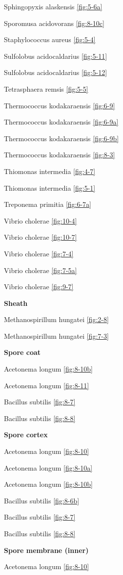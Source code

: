 \documentclass[]{tufte-book}
\begin{document}
Sphingopyxis alaskensis \ref{fig:5-6a}

Sporomusa acidovorans \ref{fig:8-10c}

Staphylococcus aureus \ref{fig:5-4}

Sulfolobus acidocaldarius \ref{fig:5-11}

Sulfolobus acidocaldarius \ref{fig:5-12}

Tetrasphaera remsis \ref{fig:5-5}

Thermococcus kodakaraensis \ref{fig:6-9}

Thermococcus kodakaraensis \ref{fig:6-9a}

Thermococcus kodakaraensis \ref{fig:6-9b}

Thermococcus kodakaraensis \ref{fig:8-3}

Thiomonas intermedia \ref{fig:4-7}

Thiomonas intermedia \ref{fig:5-1}

Treponema primitia \ref{fig:6-7a}

Vibrio cholerae \ref{fig:10-4}

Vibrio cholerae \ref{fig:10-7}

Vibrio cholerae \ref{fig:7-4}

Vibrio cholerae \ref{fig:7-5a}

Vibrio cholerae \ref{fig:9-7}

\textbf{Sheath}

Methanospirillum hungatei \ref{fig:2-8}

Methanospirillum hungatei \ref{fig:7-3}

\textbf{Spore coat}

Acetonema longum \ref{fig:8-10b}

Acetonema longum \ref{fig:8-11}

Bacillus subtilis \ref{fig:8-7}

Bacillus subtilis \ref{fig:8-8}

\textbf{Spore cortex}

Acetonema longum \ref{fig:8-10}

Acetonema longum \ref{fig:8-10a}

Acetonema longum \ref{fig:8-10b}

Bacillus subtilis \ref{fig:8-6b}

Bacillus subtilis \ref{fig:8-7}

Bacillus subtilis \ref{fig:8-8}

\textbf{Spore membrane (inner)}

Acetonema longum \ref{fig:8-10}
\end{document}
